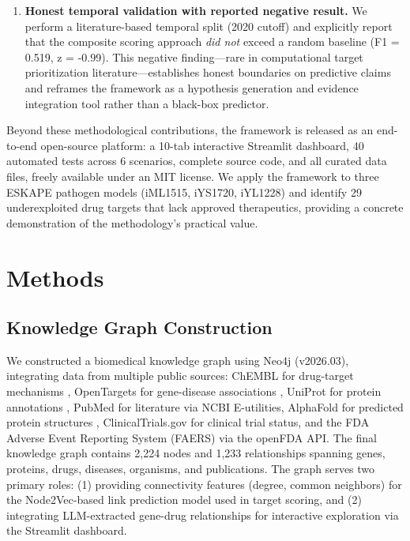 \documentclass[12pt,a4paper]{article}
\begin{document}
\begin{enumerate}
    \item \textbf{Honest temporal validation with reported negative result.} We perform a literature-based temporal split (2020 cutoff) and explicitly report that the composite scoring approach \textit{did not} exceed a random baseline (F1 = 0.519, z = -0.99). This negative finding---rare in computational target prioritization literature---establishes honest boundaries on predictive claims and reframes the framework as a hypothesis generation and evidence integration tool rather than a black-box predictor.
\end{enumerate}

Beyond these methodological contributions, the framework is released as an end-to-end open-source platform: a 10-tab interactive Streamlit dashboard, 40 automated tests across 6 scenarios, complete source code, and all curated data files, freely available under an MIT license. We apply the framework to three ESKAPE pathogen models (iML1515, iYS1720, iYL1228) and identify 29 underexploited drug targets that lack approved therapeutics, providing a concrete demonstration of the methodology's practical value.

\section{Methods}

\subsection{Knowledge Graph Construction}
We constructed a biomedical knowledge graph using Neo4j (v2026.03), integrating data from multiple public sources: ChEMBL for drug-target mechanisms \citep{mendez2019}, OpenTargets for gene-disease associations \citep{ochoa2021}, UniProt for protein annotations \citep{uniprot2023}, PubMed for literature via NCBI E-utilities, AlphaFold for predicted protein structures \citep{jumper2021}, ClinicalTrials.gov for clinical trial status, and the FDA Adverse Event Reporting System (FAERS) via the openFDA API. The final knowledge graph contains 2,224 nodes and 1,233 relationships spanning genes, proteins, drugs, diseases, organisms, and publications. The graph serves two primary roles: (1) providing connectivity features (degree, common neighbors) for the Node2Vec-based link prediction model used in target scoring, and (2) integrating LLM-extracted gene-drug relationships for interactive exploration via the Streamlit dashboard.
\end{document}

